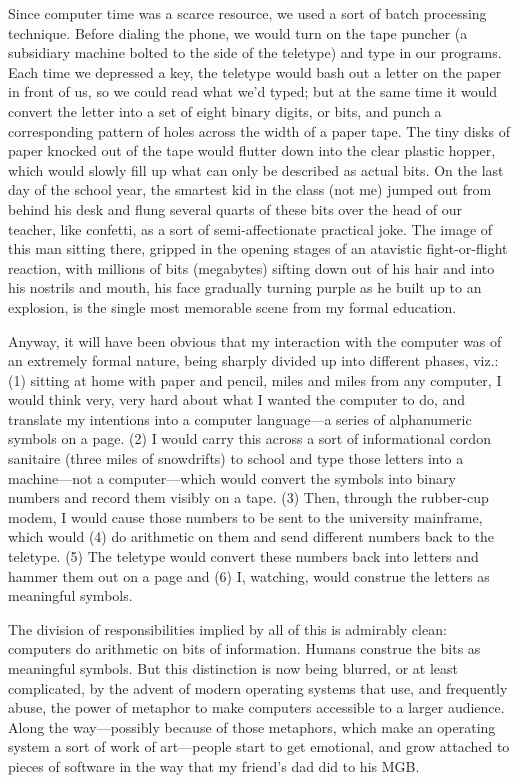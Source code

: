 \documentclass[
  fontsize=11pt,
  paper=landscape,
  twocolumn=true,
  pagesize=pdftex,
  headings=small,
  DIV=15,
  ]{scrartcl}
\begin{document}
Since computer time was a scarce resource, we used a sort of batch
processing technique. Before dialing the phone, we would turn on the
tape puncher (a subsidiary machine bolted to the side of the teletype)
and type in our programs. Each time we depressed a key, the teletype
would bash out a letter on the paper in front of us, so we could read
what we'd typed; but at the same time it would convert the letter into a
set of eight binary digits, or bits, and punch a corresponding pattern
of holes across the width of a paper tape. The tiny disks of paper
knocked out of the tape would flutter down into the clear plastic
hopper, which would slowly fill up what can only be described as actual
bits. On the last day of the school year, the smartest kid in the class
(not me) jumped out from behind his desk and flung several quarts of
these bits over the head of our teacher, like confetti, as a sort of
semi-affectionate practical joke. The image of this man sitting there,
gripped in the opening stages of an atavistic fight-or-flight reaction,
with millions of bits (megabytes) sifting down out of his hair and into
his nostrils and mouth, his face gradually turning purple as he built up
to an explosion, is the single most memorable scene from my formal
education.

Anyway, it will have been obvious that my interaction with the computer
was of an extremely formal nature, being sharply divided up into
different phases, viz.: (1) sitting at home with paper and pencil, miles
and miles from any computer, I would think very, very hard about what I
wanted the computer to do, and translate my intentions into a computer
language---a series of alphanumeric symbols on a page. (2) I would carry
this across a sort of informational cordon sanitaire (three miles of
snowdrifts) to school and type those letters into a machine---not a
computer---which would convert the symbols into binary numbers and
record them visibly on a tape. (3) Then, through the rubber-cup modem, I
would cause those numbers to be sent to the university mainframe, which
would (4) do arithmetic on them and send different numbers back to the
teletype. (5) The teletype would convert these numbers back into letters
and hammer them out on a page and (6) I, watching, would construe the
letters as meaningful symbols.

The division of responsibilities implied by all of this is admirably
clean: computers do arithmetic on bits of information. Humans construe
the bits as meaningful symbols. But this distinction is now being
blurred, or at least complicated, by the advent of modern operating
systems that use, and frequently abuse, the power of metaphor to make
computers accessible to a larger audience. Along the way---possibly
because of those metaphors, which make an operating system a sort of
work of art---people start to get emotional, and grow attached to pieces
of software in the way that my friend's dad did to his MGB.
\end{document}

